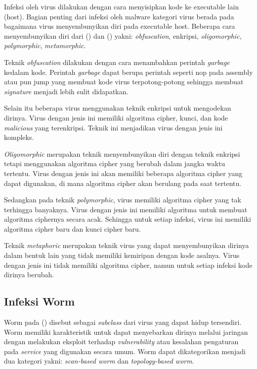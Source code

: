 Infeksi oleh virus dilakukan dengan cara menyisipkan kode ke executable lain (host). Bagian penting dari infeksi oleh malware kategori virus berada pada bagaimana virus menyembunyikan diri pada executable host. Beberapa cara menyembunyikan diri dari (\cite{6620049}) dan (\cite{alsamer2016}) yakni: \textit{obfuscation}, enkripsi, \textit{oligomorphic}, \textit{polymorphic}, \textit{metamorphic}.

Teknik \textit{obfuscation} dilakukan dengan cara menambahkan perintah \textit{garbage} kedalam kode. Perintah \textit{garbage} dapat berupa perintah seperti nop pada assembly atau pun jump yang membuat kode virus terpotong-potong sehingga membuat \textit{signature} menjadi lebih sulit didapatkan.

Selain itu beberapa virus menggunakan teknik enkripsi untuk mengodekan dirinya. Virus dengan jenis ini memiliki algoritma cipher, kunci, dan kode \textit{malicious} yang terenkripsi. Teknik ini menjadikan virus dengan jenis ini kompleks.

\textit{Oligomorphic} merupakan teknik menyembunyikan diri dengan teknik enkripsi tetapi menggunakan algoritma cipher yang berubah dalam jangka waktu tertentu. Virus dengan jenis ini akan memiliki beberapa algoritma cipher yang dapat digunakan, di mana algoritma cipher akan berulang pada saat tertentu.

Sedangkan pada teknik \textit{polymorphic}, virus memiliki algoritma cipher yang tak terhingga banyaknya. Virus dengan jenis ini memiliki algoritma untuk membuat algoritma ciphernya secara acak. Sehingga untuk setiap infeksi, virus ini memiliki algoritma cipher baru dan kunci cipher baru.

Teknik \textit{metaphoric} merupakan teknik virus yang dapat menyembunyikan dirinya dalam bentuk lain yang tidak memiliki kemiripan dengan kode asalnya. Virus dengan jenis ini tidak memiliki algoritma cipher, namun untuk setiap infeksi kode dirinya berubah.

\subsection{Infeksi Worm}

Worm pada (\cite{alsamer2016}) disebut sebagai \textit{subclass} dari virus yang dapat hidup tersendiri. Worm memiliki karakteristik untuk dapat menyebarkan dirinya melalui jaringan dengan melakukan eksploit terhadap \textit{vulnerability} atau kesalahan pengaturan pada \textit{service} yang digunakan secara umum. Worm dapat dikategorikan menjadi dua kategori yakni: \textit{scan-based worm} dan \textit{topology-based worm}.

